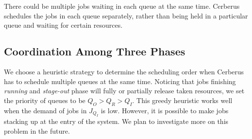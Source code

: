 There could be multiple jobs waiting in each queue at the same time. 
Cerberus schedules the jobs in each queue separately, 
rather than being held in a particular queue and waiting for certain resources.

\subsection{Coordination Among Three Phases}
We choose a heuristic strategy to determine the scheduling order when
Cerberus has to schedule multiple queues at the same time.
Noticing that jobs finishing \textit{running} and \textit{stage-out} phase
will fully or partially release taken resources,
we set the priority of queues to be $Q_O > Q_R > Q_I$.
This greedy heuristic works well when the demand of jobs in $J_{Q_I}$ is low.
However, it is possible to make jobs stacking up at the entry of the system.
We plan to investigate more on this problem in the future.



